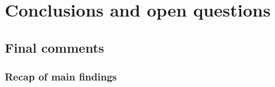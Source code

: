 \setchapterpreamble[u]{\margintoc}
\chapter{Conclusions and open questions}


\section{Final comments} 

\subsection{Recap of main findings}

